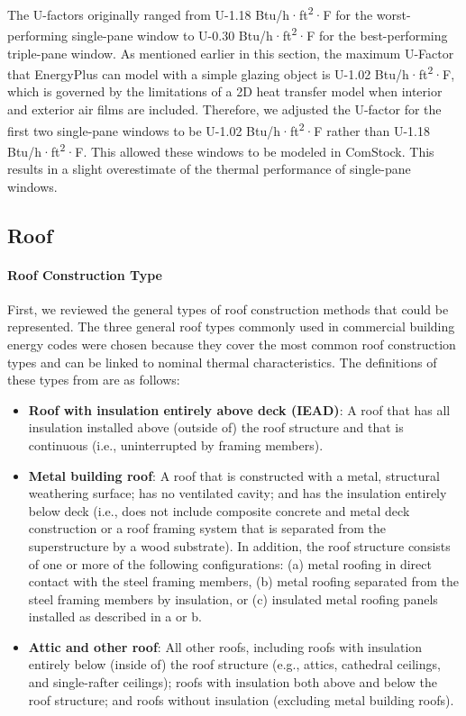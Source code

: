 The U-factors originally ranged from U-1.18 Btu/h·ft\textsuperscript{2}·F for the worst-performing single-pane window to U-0.30 Btu/h·ft\textsuperscript{2}·F for the best-performing triple-pane window. As mentioned earlier in this section, the maximum U-Factor that EnergyPlus can model with a simple glazing object is U-1.02 Btu/h·ft\textsuperscript{2}·F, which is governed by the limitations of a 2D heat transfer model when interior and exterior air films are included. Therefore, we adjusted the U-factor for the first two single-pane windows to be U-1.02 Btu/h·ft\textsuperscript{2}·F rather than U-1.18 Btu/h·ft\textsuperscript{2}·F. This allowed these windows to be modeled in ComStock. This results in a slight overestimate of the thermal performance of single-pane windows.


%

\subsection{Roof} %
\paragraph{Roof Construction Type}
First, we reviewed the general types of roof construction methods that could be represented. The three general roof types commonly used in commercial building energy codes were chosen because they cover the most common roof construction types and can be linked to nominal thermal characteristics. The definitions of these types from \cite{ashrae_901_2010} are as follows:

\begin{itemize}
\item \textbf{Roof with insulation entirely above deck (IEAD)}: A roof that has all insulation installed above (outside of) the roof structure and that is continuous (i.e., uninterrupted by framing members).
\item \textbf{Metal building roof}: A roof that is constructed with a metal, structural weathering surface; has no ventilated cavity; and has the insulation entirely below deck (i.e., does not include composite concrete and metal deck construction or a roof framing system that is separated from the superstructure by a wood substrate). In addition, the roof structure consists of one or
more of the following configurations: (a) metal roofing in direct contact with the steel framing members, (b) metal roofing separated from the steel framing members by insulation, or (c) insulated metal roofing panels installed as described in a or b.
\item \textbf{Attic and other roof}: All other roofs, including roofs with insulation entirely below (inside of) the roof structure (e.g., attics, cathedral ceilings, and single-rafter ceilings); roofs with insulation both above and below the roof structure; and roofs without insulation (excluding metal building roofs).
\end{itemize}

